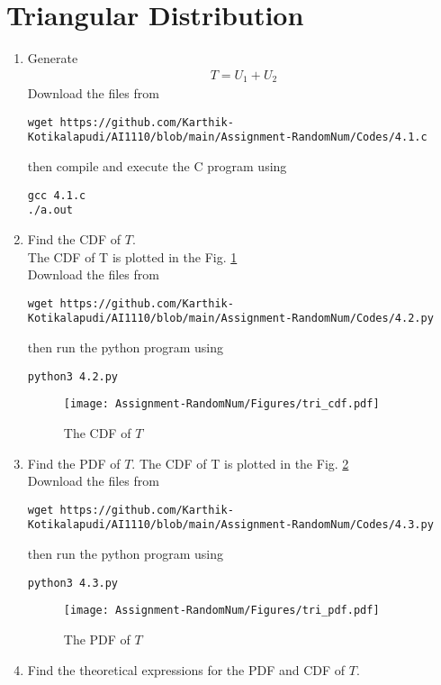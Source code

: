 \documentclass[journal,12pt,twocolumn]{IEEEtran}
\renewcommand\thesection{\arabic{section}}
\begin{document}
\section{Triangular Distribution}
\begin{enumerate}[label=\thesection.\arabic*
,ref=\thesection.\theenumi]
%
\item Generate 
	\begin{align}
		T = U_1+U_2
	\end{align}
\solution 
Download the files from
\begin{lstlisting}
wget https://github.com/Karthik-Kotikalapudi/AI1110/blob/main/Assignment-RandomNum/Codes/4.1.c
\end{lstlisting}
then compile and execute the  C program using
\begin{lstlisting}
gcc 4.1.c
./a.out
\end{lstlisting}
\item Find the CDF of $T$.\\
\solution
The CDF of T is plotted in the Fig. \ref{fig:tri_cdf}\\
Download the files from
\begin{lstlisting}
wget https://github.com/Karthik-Kotikalapudi/AI1110/blob/main/Assignment-RandomNum/Codes/4.2.py
\end{lstlisting}
then run the python program using
\begin{lstlisting}
python3 4.2.py
\end{lstlisting}
\begin{figure}[ht!]
\centering
\texttt{[image: Assignment-RandomNum/Figures/tri\_cdf.pdf]}
\caption{The CDF of $T$}
\label{fig:tri_cdf}
\end{figure}
\item Find the PDF of $T$.
\solution
The CDF of T is plotted in the Fig. \ref{fig:tri_pdf}\\
Download the files from
\begin{lstlisting}
wget https://github.com/Karthik-Kotikalapudi/AI1110/blob/main/Assignment-RandomNum/Codes/4.3.py
\end{lstlisting}
then run the python program using
\begin{lstlisting}
python3 4.3.py
\end{lstlisting}
\begin{figure}[ht!]
\centering
\texttt{[image: Assignment-RandomNum/Figures/tri\_pdf.pdf]}
\caption{The PDF of $T$}
\label{fig:tri_pdf}
\end{figure}
\item Find the theoretical expressions for the PDF and CDF of $T$.\\

\end{enumerate}
\end{document}
